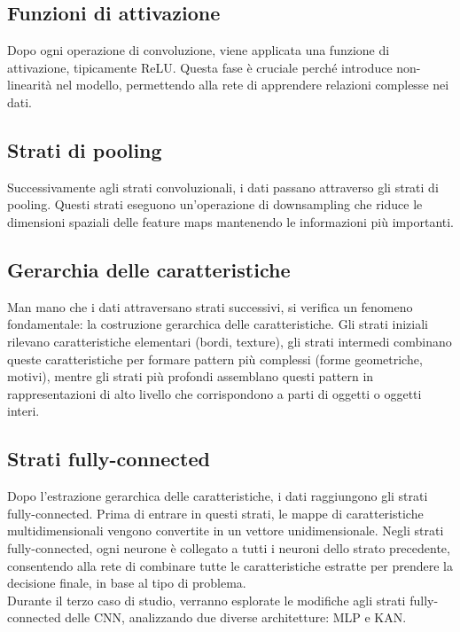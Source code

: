 \documentclass[a4paper,12pt]{report}
\begin{document}
	\subsection{Funzioni di attivazione}
	Dopo ogni operazione di convoluzione, viene applicata una funzione di attivazione, tipicamente ReLU. Questa fase è cruciale perché introduce non-linearità nel modello, permettendo alla rete di apprendere relazioni complesse nei dati.
	
	\subsection{Strati di pooling}
	Successivamente agli strati convoluzionali, i dati passano attraverso gli strati di pooling. Questi strati eseguono un’operazione di downsampling che riduce le dimensioni spaziali delle feature maps mantenendo le informazioni più importanti.
	
	\subsection{Gerarchia delle caratteristiche}
	Man mano che i dati attraversano strati successivi, si verifica un fenomeno fondamentale: la costruzione gerarchica delle caratteristiche. Gli strati iniziali rilevano caratteristiche elementari (bordi, texture), gli strati intermedi combinano queste caratteristiche per formare pattern più complessi (forme geometriche, motivi), mentre gli strati più profondi assemblano questi pattern in rappresentazioni di alto livello che corrispondono a parti di oggetti o oggetti interi.
	
	\subsection{Strati fully-connected}
	Dopo l'estrazione gerarchica delle caratteristiche, i dati raggiungono gli strati fully-connected. Prima di entrare in questi strati, le mappe di caratteristiche multidimensionali vengono convertite in un vettore unidimensionale. Negli strati fully-connected, ogni neurone è collegato a tutti i neuroni dello strato precedente, consentendo alla rete di combinare tutte le caratteristiche estratte per prendere la decisione finale, in base al tipo di problema. \\
	Durante il terzo caso di studio, verranno esplorate le modifiche agli strati fully-connected delle CNN, analizzando due diverse architetture: MLP e KAN.
	
\end{document}

